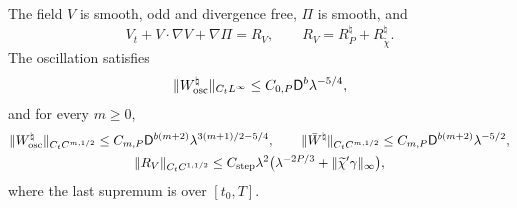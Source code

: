 \begin{lemma}\label{cc:uf:step:lem:approximate}
The field \(V\) is smooth, odd and
divergence free, \(\Pi\) is smooth, and
\begin{equation}\label{cc:uf:step:eq:approximate}
 V_t+V\cdot\nabla V+\nabla\Pi=R_V,\qquad
 R_V=R_P^\natural+R_{\widetilde\chi}^\natural .
\end{equation}
The oscillation satisfies
\begin{equation}\label{cc:uf:step:eq:physical-sup}
 \|W_{\rm osc}^\natural\|_{C_tL^\infty}
 \le C_{0,P}\mathsf D^b\lambda^{-5/4},
\end{equation}
and for every \(m\ge0\),
\begin{equation}\label{cc:uf:step:eq:physical}
\begin{gathered}
 \|W_{\rm osc}^\natural\|_{C_tC^{m,1/2}}
 \le C_{m,P}\mathsf D^{b(m+2)}\lambda^{3(m+1)/2-5/4},\qquad
 \|\bar W^\natural\|_{C_tC^{m,1/2}}
 \le C_{m,P}\mathsf D^{b(m+2)}\lambda^{-5/2},\\
 \|R_V\|_{C_tC^{1,1/2}}
 \le C_{\rm step}\lambda^2
   \bigl(\lambda^{-2P/3}+\|\widetilde\chi'\gamma\|_\infty\bigr),
\end{gathered}
\end{equation}
where the last supremum is over $[t_0,T]$.
\end{lemma}
